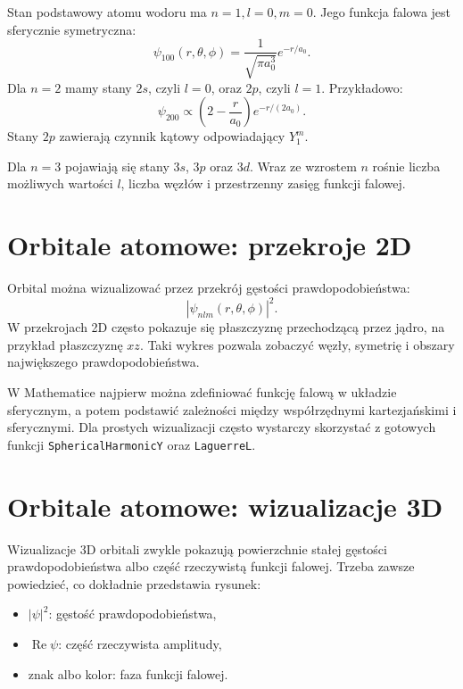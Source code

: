 Stan podstawowy atomu wodoru ma \(n=1,l=0,m=0\). Jego funkcja falowa jest sferycznie symetryczna:
\begin{equation}
    \psi_{100}(r,\theta,\phi)=\frac{1}{\sqrt{\pi a_0^3}}e^{-r/a_0}.
\end{equation}
Dla \(n=2\) mamy stany \(2s\), czyli \(l=0\), oraz \(2p\), czyli \(l=1\). Przykładowo:
\begin{equation}
    \psi_{200}\propto \left(2-\frac{r}{a_0}\right)e^{-r/(2a_0)}.
\end{equation}
Stany \(2p\) zawierają czynnik kątowy odpowiadający \(Y_1^m\).

Dla \(n=3\) pojawiają się stany \(3s\), \(3p\) oraz \(3d\). Wraz ze wzrostem \(n\) rośnie liczba możliwych wartości \(l\), liczba węzłów i przestrzenny zasięg funkcji falowej.

\section{Orbitale atomowe: przekroje 2D}

Orbital można wizualizować przez przekrój gęstości prawdopodobieństwa:
\begin{equation}
    |\psi_{nlm}(r,\theta,\phi)|^2.
\end{equation}
W przekrojach 2D często pokazuje się płaszczyznę przechodzącą przez jądro, na przykład płaszczyznę \(xz\). Taki wykres pozwala zobaczyć węzły, symetrię i obszary największego prawdopodobieństwa.

W Mathematice najpierw można zdefiniować funkcję falową w układzie sferycznym, a potem podstawić zależności między współrzędnymi kartezjańskimi i sferycznymi. Dla prostych wizualizacji często wystarczy skorzystać z gotowych funkcji \texttt{SphericalHarmonicY} oraz \texttt{LaguerreL}.

\section{Orbitale atomowe: wizualizacje 3D}

Wizualizacje 3D orbitali zwykle pokazują powierzchnie stałej gęstości prawdopodobieństwa albo część rzeczywistą funkcji falowej. Trzeba zawsze powiedzieć, co dokładnie przedstawia rysunek:
\begin{itemize}
    \item \(|\psi|^2\): gęstość prawdopodobieństwa,
    \item \(\operatorname{Re}\psi\): część rzeczywista amplitudy,
    \item znak albo kolor: faza funkcji falowej.
\end{itemize}

